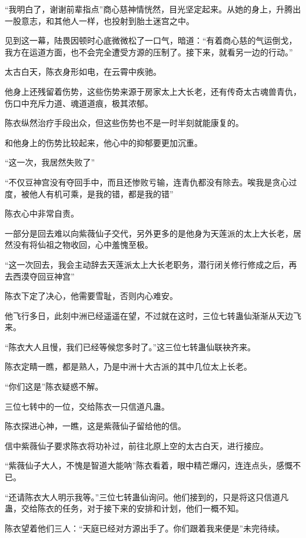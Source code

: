 \begin{this_body}
“我明白了，谢谢前辈指点”商心慈神情恍然，目光坚定起来。从她的身上，升腾出一股意志，和其他人一样，也投射到胎土迷宫之中。

见到这一幕，陆畏因顿时心底微微松了一口气，暗道：“有着商心慈的气运倒戈，我方在运道方面，也不会完全遭受方源的压制了。接下来，就看另一边的行动。”

太古白天，陈衣身形如电，在云霄中疾驰。

他身上还残留着伤势，这些伤势来源于房家太上大长老，还有传奇太古魂兽青仇，伤口中充斥力道、魂道道痕，极其浓郁。

陈衣纵然治疗手段出众，但这些伤势也不是一时半刻就能康复的。

和他身上的伤势比较起来，他心中的抑郁要更加沉重。

“这一次，我居然失败了”

“不仅豆神宫没有夺回手中，而且还惨败亏输，连青仇都没有除去。唉我是贪心过度，被他人有机可乘，是我的错，都是我的错”

陈衣心中非常自责。

一部分是回去难以向紫薇仙子交代，另外更多的是他身为天莲派的太上大长老，居然没有将仙祖之物收回，心中羞愧至极。

“这一次回去，我会主动辞去天莲派太上大长老职务，潜行闭关修行修成之后，再去西漠夺回豆神宫”

陈衣下定了决心，他需要雪耻，否则内心难安。

他飞行多日，此刻中洲已经遥遥在望，不过就在这时，三位七转蛊仙渐渐从天边飞来。

“陈衣大人且慢，我们已经等候您多时了。”这三位七转蛊仙联袂齐来。

陈衣定睛一瞧，都是熟人，乃是中洲十大古派的其中几位太上长老。

“你们这是”陈衣疑惑不解。

三位七转中的一位，交给陈衣一只信道凡蛊。

陈衣探进心神，一瞧，这是紫薇仙子留给他的信。

信中紫薇仙子要求陈衣将功补过，前往北原上空的太古白天，进行接应。

“紫薇仙子大人，不愧是智道大能呐”陈衣看着，眼中精芒爆闪，连连点头，感慨不已。

“还请陈衣大人明示我等。”三位七转蛊仙询问。他们接到的，只是将这只信道凡蛊，交给陈衣的任务，对于接下来的安排和计划，他们一概不知。

陈衣望着他们三人：“天庭已经对方源出手了。你们跟着我来便是”未完待续。

\end{this_body}

